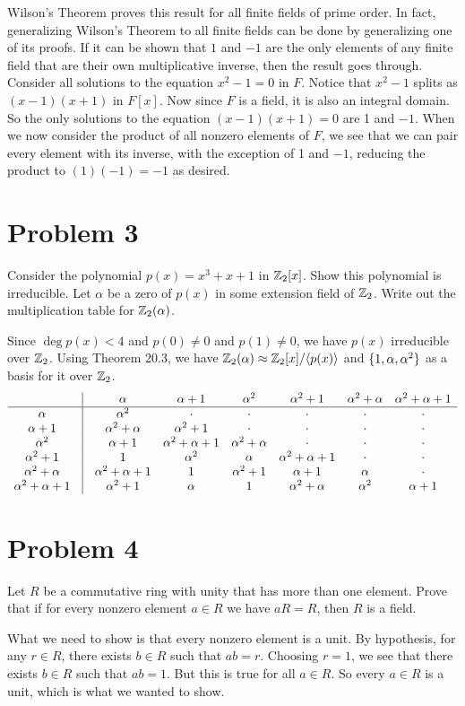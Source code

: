 \documentclass{article}
\begin{document}
Wilson's Theorem proves this result for all finite fields of prime order.
In fact, generalizing Wilson's Theorem to all finite fields can be done
by generalizing one of its proofs.  If it can be shown that $1$ and $-1$ are
the only elements of any finite field that are their own multiplicative
inverse, then the result goes through.  Consider all solutions to
the equation $x^2-1=0$ in $F$.  Notice that $x^2-1$ splits as $(x-1)(x+1)$ in $F[x]$.
Now since $F$ is a field, it is also an integral domain.
So the only solutions to the equation $(x-1)(x+1)=0$ are 1 and $-1$.
When we now consider the product of all nonzero elements of $F$, we see that
we can pair every element with its inverse, with the exception
of 1 and $-1$, reducing the product to $(1)(-1)=-1$ as desired.

\section*{Problem 3}

Consider the polynomial $p(x)=x^3+x+1$ in $\mathbb{Z}_2[x]$.  Show this polynomial is irreducible.
Let $\alpha$ be a zero of $p(x)$ in some extension field of $\mathbb{Z}_2$.  Write out the
multiplication table for $\mathbb{Z}_2(\alpha)$.

Since $\deg p(x)<4$ and $p(0)\neq 0$ and $p(1)\neq 0$, we have $p(x)$ irreducible over $\mathbb{Z}_2$.
Using Theorem 20.3, we have $\mathbb{Z}_2(\alpha)\approx\mathbb{Z}_2[x]/\langle p(x)\rangle$ and
$\{1,\alpha,\alpha^2\}$ as a basis for it over $\mathbb{Z}_2$.
\begin{equation*}
\begin{array}{cccccccc}
 & \vline & \al & \al+1 & \al^2 & \al^2+1 & \al^2+\al & \al^2+\al+1 \\
\hline
\al & \vline & \al^2 & \cdot & \cdot & \cdot & \cdot & \cdot \\
\al+1 & \vline & \al^2+\al & \al^2+1 & \cdot & \cdot & \cdot & \cdot \\
\al^2 & \vline & \al+1 & \al^2+\al+1 & \al^2+\al & \cdot & \cdot & \cdot \\
\al^2+1 & \vline & 1 & \al^2 & \al & \al^2+\al+1 & \cdot & \cdot \\
\al^2+\al & \vline & \al^2+\al+1 & 1 & \al^2+1 & \al+1 & \al & \cdot \\
\al^2+\al+1 & \vline & \al^2+1 & \al & 1 & \al^2+\al & \al^2 & \al+1
\end{array}
\end{equation*}

\section*{Problem 4}

Let $R$ be a commutative ring with unity that has more than one element.
Prove that if for every nonzero element $a\in R$ we have $aR=R$, then $R$ is a field.

What we need to show is that every nonzero element is a unit.
By hypothesis, for any $r\in R$, there exists $b\in R$
such that $ab=r$.  Choosing $r=1$, we see that there
exists $b\in R$ such that $ab=1$.  But this is true for all $a\in R$.
So every $a\in R$ is a unit, which is what we wanted to show.
\end{document}
